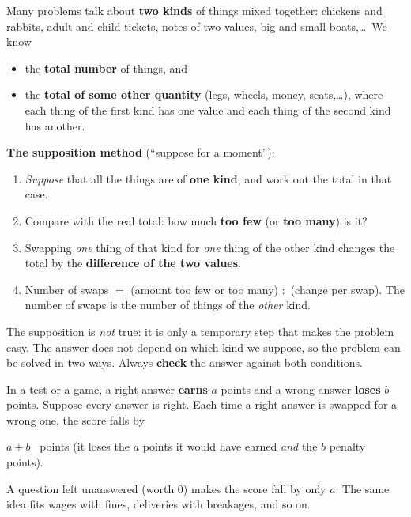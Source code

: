 \begin{knowbox}
Many problems talk about \textbf{two kinds} of things mixed together: chickens and rabbits, adult and child tickets, notes of two values, big and small boats,\ldots\ We know
\begin{itemize}[leftmargin=1.4em,itemsep=3pt]
\item the \textbf{total number} of things, and
\item the \textbf{total of some other quantity} (legs, wheels, money, seats,\ldots), where each thing of the first kind has one value and each thing of the second kind has another.
\end{itemize}
\textbf{The supposition method} (``suppose for a moment''):
\begin{enumerate}[leftmargin=1.6em,itemsep=2pt]
\item \emph{Suppose} that all the things are of \textbf{one kind}, and work out the total in that case.
\item Compare with the real total: how much \textbf{too few} (or \textbf{too many}) is it?
\item Swapping \emph{one} thing of that kind for \emph{one} thing of the other kind changes the total by the \textbf{difference of the two values}.
\item Number of swaps $=$ (amount too few or too many) $:$ (change per swap). The number of swaps is the number of things of the \emph{other} kind.
\end{enumerate}
The supposition is \emph{not} true: it is only a temporary step that makes the problem easy. The answer does not depend on which kind we suppose, so the problem can be solved in two ways. Always \textbf{check} the answer against both conditions.
\end{knowbox}

\begin{knowbox}
In a test or a game, a right answer \textbf{earns} $a$ points and a wrong answer \textbf{loses} $b$ points. Suppose every answer is right. Each time a right answer is swapped for a wrong one, the score falls by
\begin{center}
$a+b$ \ points \quad (it loses the $a$ points it would have earned \emph{and} the $b$ penalty points).
\end{center}
A question left unanswered (worth $0$) makes the score fall by only $a$. The same idea fits wages with fines, deliveries with breakages, and so on.
\end{knowbox}

